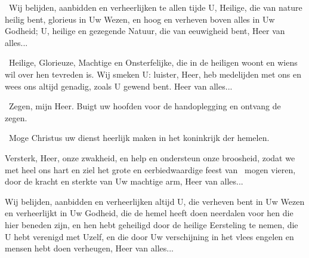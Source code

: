 \documentclass[12pt,twoside,a5paper]{article}
\begin{document}
\begin{halfparskip}
   \cc~Wij belijden, aanbidden en verheerlijken te allen tijde U, Heilige, die van nature heilig bent, glorieus in Uw Wezen, en hoog en verheven boven alles in Uw Godheid; U, heilige en gezegende Natuur, die van eeuwigheid bent, Heer van alles...
\end{halfparskip}

\begin{halfparskip}
   \cc~Heilige, Glorieuze, Machtige en Onsterfelijke, die in de heiligen woont en wiens wil over hen tevreden is. Wij smeken U: luister, Heer, heb medelijden met ons en wees ons altijd genadig, zoals U gewend bent. Heer van alles...
\end{halfparskip}

\begin{halfparskip}
   \dd~Zegen, mijn Heer. Buigt uw hoofden voor de handoplegging en ontvang de zegen.

  \cc~Moge Christus uw dienst heerlijk maken in het koninkrijk der hemelen.

\end{halfparskip}

\begin{halfparskip}\begin{sfpar}
  \fullline


   Versterk, Heer, onze zwakheid, en help en ondersteun onze broosheid, zodat we met heel ons hart en ziel het grote en eerbiedwaardige feest van \NN~mogen vieren, door de kracht en sterkte van Uw machtige arm, Heer van alles...

   Wij belijden, aanbidden en verheerlijken altijd U, die verheven bent in Uw Wezen en verheerlijkt in Uw Godheid, die de hemel heeft doen neerdalen voor hen die hier beneden zijn, en hen hebt geheiligd door de heilige Eersteling te nemen, die U hebt verenigd met Uzelf, en die door Uw verschijning in het vlees engelen en mensen hebt doen verheugen, Heer van alles...

  \fullline
\end{sfpar}\end{halfparskip}
\end{document}
